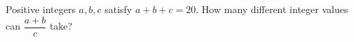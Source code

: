 Positive integers $a,b,c$ satisfy $a+b+c=20$. How many different integer values can $\dfrac{a+b}{c}$ take?
